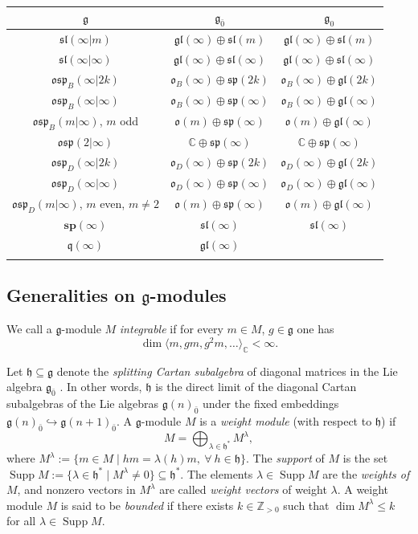 \documentclass[12pt]{amsart}
\newcommand\C{\mathbb{C}}
\newcommand\Z{\mathbb{Z}}
\newcommand\g{\mathfrak{g}}
\newcommand\fq{\mathfrak{q}}
\newcommand\fh{\mathfrak{h}}
\newcommand\fsl{\mathfrak{sl}}
\newcommand\fsp{\mathfrak{sp}}
\newcommand\fosp{\mathfrak{osp}}
\newcommand\fo{\mathfrak{o}}
\newcommand\fgl{\mathfrak{gl}}
\newcommand\bsp{\mathbf{sp}}
\DeclareMathOperator{\Supp}{Supp} %
\theoremstyle{plain}
\theoremstyle{definition}
\numberwithin{equation}{section}
\begin{document}
\begin{table}
\begin{tabular}{c  c c}
\toprule
$\g$ & $\g_{\bar 0}$ & $\g_0$ \\
\midrule
$\fsl(\infty|m)$ & $\fgl(\infty)\oplus \fsl(m)$ & $\fgl(\infty)\oplus \fsl(m)$ \\
$\fsl(\infty | \infty)$ & $\fgl(\infty)\oplus \fsl(\infty)$ & $\fgl(\infty)\oplus \fsl(\infty)$ \\
$\fosp_B(\infty|2k)$ & $\fo_B(\infty)\oplus \fsp(2k)$ & $\fo_B(\infty)\oplus \fgl(2k)$ \\
$\fosp_B(\infty|\infty)$ & $\fo_B(\infty)\oplus \fsp(\infty)$ & $\fo_B(\infty)\oplus \fgl(\infty)$ \\
$\fosp_B(m|\infty)$, $m$ odd & $\fo(m)\oplus \fsp(\infty)$ & $\fo(m)\oplus \fgl(\infty)$ \\
$\fosp(2|\infty)$ & $\C\oplus \fsp(\infty)$ & $\C\oplus \fsp(\infty)$ \\
$\fosp_D(\infty|2k)$ & $\fo_D(\infty)\oplus \fsp(2k)$ & $\fo_D(\infty)\oplus \fgl(2k)$ \\
$\fosp_D(\infty|\infty)$ & $\fo_D(\infty)\oplus \fsp(\infty)$ & $\fo_D(\infty)\oplus \fgl(\infty)$ \\
$\fosp_D(m|\infty)$, $m$ even, $m\neq 2$ & $\fo(m)\oplus \fsp(\infty)$ & $\fo(m)\oplus \fgl(\infty)$ \\
$\bsp(\infty)$ & $\fsl(\infty)$ & $\fsl(\infty)$ \\
$\fq(\infty)$ & $\fgl(\infty)$ & \\
\bottomrule
\smallskip
\end{tabular}
\caption{ } \label{table1}
\end{table}

\subsection{Generalities on $\g$-modules}
We call a $\g$-module $M$ \emph{integrable} if for every $m\in M$, $g\in \g$ one has 
	\[
\dim \langle m, gm, g^2m, \ldots\rangle_\C<\infty.
	\]

Let $\fh\subseteq \g$ denote the \emph{splitting Cartan subalgebra} of diagonal matrices in the Lie algebra $\g_{\bar 0}$ \cite{D-CPS07}. In other words, $\fh$ is the direct limit of the diagonal Cartan subalgebras of the Lie algebras $\g(n)_{\bar 0}$ under the fixed embeddings $\g(n)_{\bar 0}\hookrightarrow  \g(n+1)_{\bar 0}$. A $\g$-module $M$ is a \emph{weight module }(with respect to $\fh$) if
	\[
M = \bigoplus_{\lambda\in \fh^*} M^\lambda,
	\]
where $M^\lambda := \{m\in M\mid hm=\lambda(h)m,\ \forall \ h\in \fh\}$. The \emph{support} of $M$ is the set $\Supp M := \{\lambda\in \fh^*\mid M^\lambda\neq 0\}\subseteq \fh^*$. The elements $\lambda\in \Supp M$ are the \emph{weights of} $M$, and nonzero vectors in $M^\lambda$ are called \emph{weight vectors} of weight $\lambda$. A weight module $M$ is said to be \emph{bounded} if there exists $k\in \Z_{>0}$ such that $\dim M^\lambda \leq k$ for all $\lambda\in \Supp M$.
\end{document}
